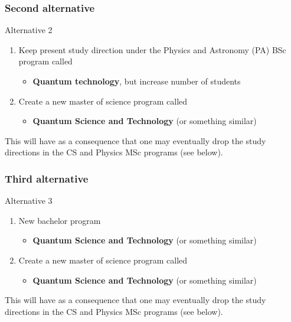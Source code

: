 \documentclass{beamer}
\begin{document}
\begin{frame}
\frametitle{Second alternative}

\begin{block}{Alternative 2 }
\begin{enumerate}
\item Keep present study direction under the Physics and Astronomy (PA) BSc program called
\begin{itemize}

  \item \textbf{Quantum technology}, but increase number of students

\end{itemize}

\noindent
\item Create a new master of science program called
\begin{itemize}

  \item \textbf{Quantum Science and Technology} (or something similar)
\end{itemize}

\noindent
\end{enumerate}

\noindent
This will have as a consequence that one may eventually drop the study directions in the CS and Physics MSc programs (see below).
\end{block}
\end{frame}

\begin{frame}
\frametitle{Third  alternative}

\begin{block}{Alternative 3 }
\begin{enumerate}
\item New bachelor program 
\begin{itemize}

  \item \textbf{Quantum Science and Technology} (or something similar)

\end{itemize}

\noindent
\item Create a new master of science program called
\begin{itemize}

  \item \textbf{Quantum Science and Technology} (or something similar)
\end{itemize}

\noindent
\end{enumerate}

\noindent
This will have as a consequence that one may eventually drop the study directions in the CS and Physics MSc programs (see below).
\end{block}
\end{frame}
\end{document}
